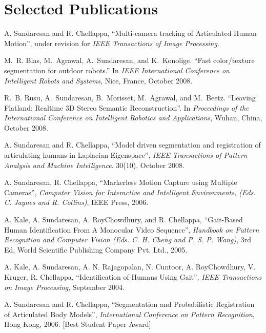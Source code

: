 \documentclass[letterpaper]{article}
\begin{document}
\section*{Selected Publications}
\begin{enumerate1}
  \item
	\begin{enumerate2}
	  \item  A. Sundaresan and R. Chellappa, ``Multi-camera tracking of Articulated
		Human Motion'', under revision for {\em IEEE Transactions of Image
		Processing}.

	  \item
		M.~R. Blas, M.~Agrawal, A.~Sundaresan, and K.~Konolige.
		``Fast color/texture segmentation for outdoor robots.''
		In {\em IEEE International Conference on Intelligent Robots and
		Systems}, Nice, France, October 2008.

	  \item
		R.~B. Rusu, A.~Sundaresan, B.~Morisset, M.~Agrawal, and M.~Beetz.
		{``Leaving Flatland: Realtime 3D Stereo Semantic Reconstruction''}.
		In {\em Proceedings of the International Conference on Intelligent
		Robotics and Applications}, Wuhan, China, October 2008.

	  \item  A. Sundaresan and R. Chellappa, ``Model driven segmentation and
		registration of articulating humans in Laplacian Eigenspace'', 
		{\em IEEE Transactions of Pattern Analysis and Machine Intelligence}.
		30(10), October 2008.
		\label{pub:pami06}

	  \item A. Sundaresan, R. Chellappa, ``Markerless Motion Capture using Multiple
		Cameras'', {\em Computer Vision for Interactive and Intelligent
		Environments, (Eds. C. Jaynes and R. Collins)}, IEEE Press, 2006.

	  \item A. Kale, A. Sundaresan, A. RoyChowdhury, and R. Chellappa, ``Gait-Based
		Human Identification From A Monocular Video Sequence'', {\em Handbook on
		Pattern Recognition and Computer Vision (Eds. C. H. Cheng and P. S. P.
		Wang)}, 3rd Ed, World Scientific Publishing Company Pvt. Ltd., 2005. 

	  \item A. Kale, A. Sundaresan, A. N. Rajagopalan, N. Cuntoor, A. RoyChowdhury,
		V. Kruger, R. Chellappa, ``Identification of Humans Using Gait'', {\em IEEE
		Transactions on Image Processing}, September 2004. 

	  \item  A. Sundaresan and R. Chellappa, ``Segmentation and Probabilistic
		Registration of Articulated Body Models'', {\em International Conference on
		Pattern Recognition}, Hong Kong, 2006. [Best Student Paper Award]
		\label{pub:icpr06}


\end{enumerate2}
\end{enumerate1}
\end{document}

